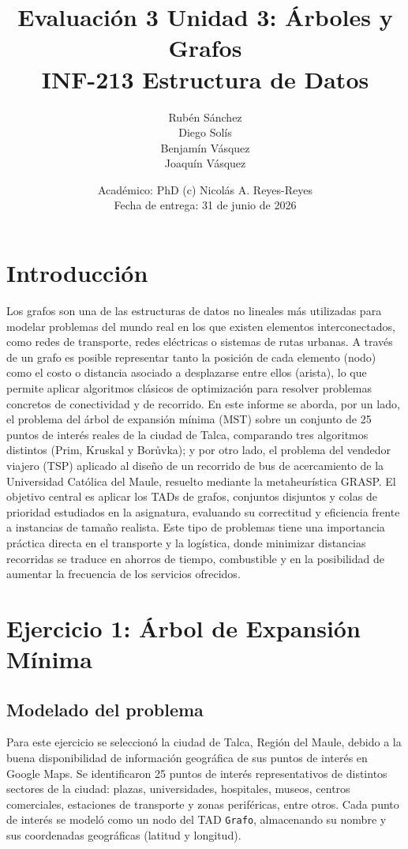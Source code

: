 \documentclass[12pt,letterpaper]{article}
\title{
    \textbf{Evaluación 3 Unidad 3: Árboles y Grafos} \\[0.3cm]
    \large INF-213 Estructura de Datos
}
\author{
    Rubén Sánchez \\
    Diego Solís \\
    Benjamín Vásquez \\
    Joaquín Vásquez
}
\date{
    Académico: PhD (c) Nicolás A. Reyes-Reyes \\[0.2cm]
    Fecha de entrega: 31 de junio de 2026
}
\begin{document}
\maketitle
\thispagestyle{empty}
\newpage

\setcounter{page}{1}

\section{Introducción}

Los grafos son una de las estructuras de datos no lineales más utilizadas para modelar
problemas del mundo real en los que existen elementos interconectados, como redes de
transporte, redes eléctricas o sistemas de rutas urbanas. A través de un grafo es posible
representar tanto la posición de cada elemento (nodo) como el costo o distancia asociado a
desplazarse entre ellos (arista), lo que permite aplicar algoritmos clásicos de optimización
para resolver problemas concretos de conectividad y de recorrido. En este informe se aborda,
por un lado, el problema del árbol de expansión mínima (MST) sobre un conjunto de 25 puntos de
interés reales de la ciudad de Talca, comparando tres algoritmos distintos (Prim, Kruskal y
Borůvka); y por otro lado, el problema del vendedor viajero (TSP) aplicado al diseño de un
recorrido de bus de acercamiento de la Universidad Católica del Maule, resuelto mediante la
metaheurística GRASP. El objetivo central es aplicar los TADs de grafos, conjuntos disjuntos y
colas de prioridad estudiados en la asignatura, evaluando su correctitud y eficiencia frente a
instancias de tamaño realista. Este tipo de problemas tiene una importancia práctica directa en
el transporte y la logística, donde minimizar distancias recorridas se traduce en ahorros de
tiempo, combustible y en la posibilidad de aumentar la frecuencia de los servicios ofrecidos.

\section{Ejercicio 1: Árbol de Expansión Mínima}

\subsection{Modelado del problema}

Para este ejercicio se seleccionó la ciudad de Talca, Región del Maule, debido a la buena
disponibilidad de información geográfica de sus puntos de interés en Google Maps. Se
identificaron 25 puntos de interés representativos de distintos sectores de la ciudad: plazas,
universidades, hospitales, museos, centros comerciales, estaciones de transporte y zonas
periféricas, entre otros. Cada punto de interés se modeló como un nodo del TAD \texttt{Grafo},
almacenando su nombre y sus coordenadas geográficas (latitud y longitud).
\end{document}
